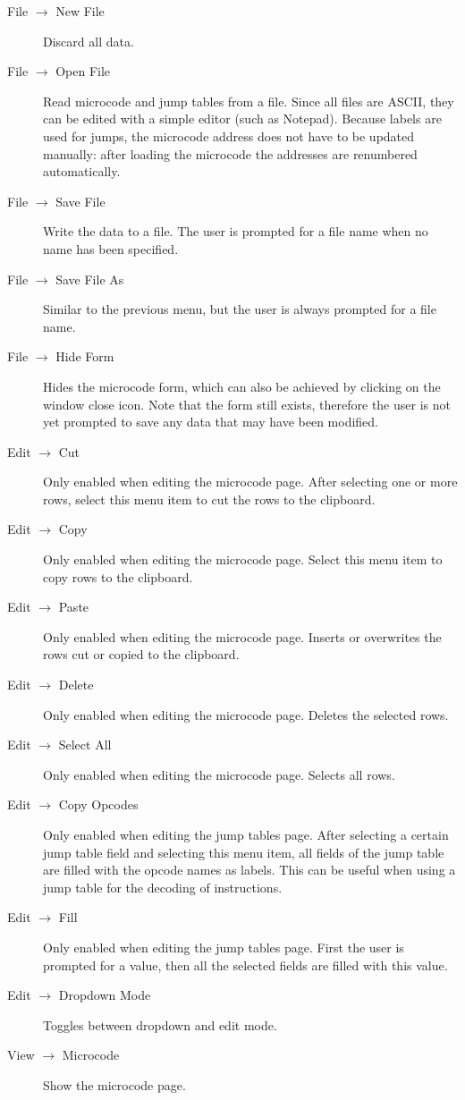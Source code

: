 \documentclass{article}
\begin{document}
\begin{description}
\item[File $\to$ New File] Discard all data.
\item[File $\to$ Open File] Read microcode and jump 
tables from a file. Since all files are ASCII, they can be edited with a
 simple editor (such as Notepad). Because labels are used for jumps, the
 microcode address does not have to be updated manually: after loading 
the microcode the addresses are renumbered automatically.
\item[File $\to$ Save File] Write the data to a file. The user is prompted for a file name when no name has been specified.
\item[File $\to$ Save File As] Similar to the previous menu, but the user is always prompted for a file name.
\item[File $\to$ Hide Form] Hides the microcode form, 
which can also be achieved by clicking on the window close icon. Note 
that the form still exists, therefore the user is not yet prompted to 
save any data that may have been modified.
\item[Edit $\to$ Cut] Only enabled when editing the 
microcode page. After selecting one or more rows, select this menu item 
to cut the rows to the clipboard.
\item[Edit $\to$ Copy] Only enabled when editing the microcode page. Select this menu item to copy rows to the clipboard.
\item[Edit $\to$ Paste] Only enabled when editing the microcode page. Inserts or overwrites the rows cut or copied to the clipboard.
\item[Edit $\to$ Delete] Only enabled when editing the microcode page. Deletes the selected rows.
\item[Edit $\to$ Select All] Only enabled when editing the microcode page. Selects all rows.
\item[Edit $\to$ Copy Opcodes] Only enabled when 
editing the jump tables page. After selecting a certain jump table field
 and selecting this menu item, all fields of the jump table are filled 
with the opcode names as labels. This can be useful when using a jump 
table for the decoding of instructions.
\item[Edit $\to$ Fill] Only enabled when editing the 
jump tables page. First the user is prompted for a value, then all the 
selected fields are filled with this value.
\item[Edit $\to$ Dropdown Mode] Toggles between dropdown and edit mode.
\item[View $\to$ Microcode] Show the microcode page.

\end{description}
\end{document}
